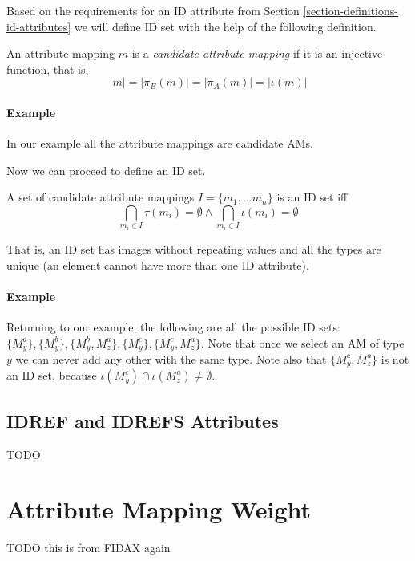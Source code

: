 Based on the requirements for an ID attribute from Section \ref{section-definitions-id-attributes} we will define ID set with the help of the following definition.

\begin{define}
An attribute mapping $m$ is a \textit{candidate attribute mapping} if it is an injective function, that is,
\[|m| = |\pi_E(m)| = |\pi_A(m)| = |\iota(m)|\]
\end{define}

\paragraph{Example}
In our example all the attribute mappings are candidate AMs.

Now we can proceed to define an ID set.

\begin{define}[ID set]
A set of candidate attribute mappings $I = \{m_1, \ldots m_n\}$ is an ID set iff
\[\bigcap_{m_i \in I} \tau(m_i) = \emptyset \wedge \bigcap_{m_i \in I} \iota(m_i) = \emptyset\]
\end{define}

That is, an ID set has images without repeating values and all the types are unique (an element cannot have more than one ID attribute).

\paragraph{Example}
Returning to our example, the following are all the possible ID sets: $\{ M_{y}^{a} \}, \{ M_{y}^{b} \}, \{ M_{y}^{b}, M_{z}^{a} \}, \{ M_{y}^{c} \}, \{ M_{y}^{c}, M_{z}^{a} \}$. Note that once we select an AM of type $y$ we can never add any other with the same type. Note also that $\{ M_{y}^{c}, M_{z}^{a} \}$ is not an ID set, because $\iota(M_{y}^{c}) \cap \iota(M_{z}^{a}) \neq \emptyset$.

\subsection{IDREF and IDREFS Attributes}

TODO

\section{Attribute Mapping Weight}

TODO this is from FIDAX again

